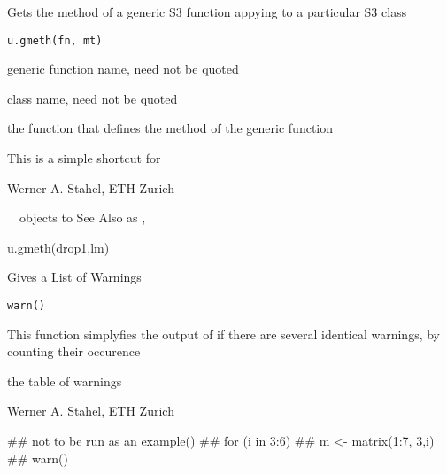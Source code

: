 \documentclass{article}
\begin{document}
\begin{Description}\relax
Gets the method of a generic S3 function appying to a particular S3 class
\end{Description}
\begin{Usage}
\begin{verbatim}
u.gmeth(fn, mt)
\end{verbatim}
\end{Usage}
\begin{Arguments}
\begin{ldescription}
\item[\code{fn}] generic function name, need not be quoted
\item[\code{mt}] class name, need not be quoted
\end{ldescription}
\end{Arguments}
\begin{Value}
the function that defines the method of the generic function
\end{Value}
\begin{Note}\relax
This is a simple shortcut for
\end{Note}
\begin{Author}\relax
Werner A. Stahel, ETH Zurich
\end{Author}
\begin{SeeAlso}\relax
~~objects to See Also as , ~~~
\end{SeeAlso}
\begin{Examples}
\begin{ExampleCode}
u.gmeth(drop1,lm)
\end{ExampleCode}
\end{Examples}

\begin{Description}\relax
Gives a List of Warnings
\end{Description}
\begin{Usage}
\begin{verbatim}
warn()
\end{verbatim}
\end{Usage}
\begin{Details}\relax
This function simplyfies the output of  if there
are several identical warnings, by counting their occurence
\end{Details}
\begin{Value}
the table of warnings
\end{Value}
\begin{Author}\relax
Werner A. Stahel, ETH Zurich
\end{Author}
\begin{SeeAlso}\relax
{}
\end{SeeAlso}
\begin{Examples}
\begin{ExampleCode}
##  not to be run as an example()
##  for (i in 3:6)
##    m <- matrix(1:7, 3,i)
##  warn()
\end{ExampleCode}
\end{Examples}
\end{document}
